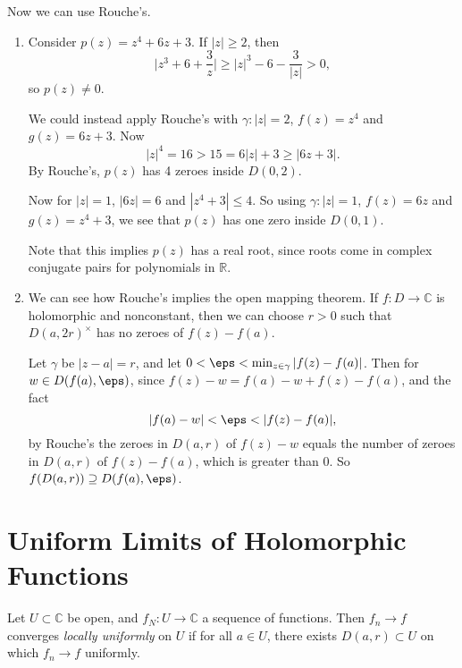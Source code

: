\documentclass[12pt]{article}
\begin{document}
Now we can use Rouche's.

\begin{exbox}
	\begin{enumerate}
		\item Consider $p(z)=  z^4 + 6z + 3$. If $|z| \ge 2$, then
			\[
			\biggl|z^3 + 6 + \frac{3}{z} \biggr| \ge |z|^3 - 6 - \frac{3}{|z|} > 0,
			\]
			so $p(z) \neq 0$.

			We could instead apply Rouche's with $\gamma : |z| = 2$, $f(z) = z^{4}$ and $g(z) = 6z + 3$. Now
			\[
			|z|^{4} = 16 > 15 = 6|z|+3 \ge |6z + 3|.
			\]
			By Rouche's, $p(z)$ has 4 zeroes inside $D(0, 2)$.

			Now for $|z| = 1$, $|6z| = 6$ and $|z^{4} + 3| \le 4$. So using $\gamma : |z| = 1$, $f(z) = 6z$ and $g(z) = z^{4} + 3$, we see that $p(z)$ has one zero inside $D(0, 1)$.

			Note that this implies $p(z)$ has a real root, since roots come in complex conjugate pairs for polynomials in $\mathbb{R}$.
		\item We can see how Rouche's implies the open mapping theorem. If $f : D \to \mathbb{C}$ is holomorphic and nonconstant, then we can choose $r > 0$ such that $D(a, 2r)^{\times}$ has no zeroes of $f(z) - f(a)$.

			Let $\gamma$ be $|z-a| = r$, and let $0 < \eps < \min_{z \in \gamma}|f(z)-f(a)|$. Then for $w \in D(f(a), \eps)$, since $f(z) - w = f(a) - w + f(z) - f(a)$, and the fact
			\[
			|f(a) - w| < \eps < |f(z) - f(a)|,
			\]
			by Rouche's the zeroes in $D(a, r)$ of $f(z) - w$ equals the number of zeroes in $D(a, r)$ of $f(z) - f(a)$, which is greater than $0$. So $f(D(a, r)) \supseteq D(f(a), \eps)$.
	\end{enumerate}
\end{exbox}

\newpage

\section{Uniform Limits of Holomorphic Functions}
\label{sec:uniform_limits_of_holomorphic_functions}

\begin{definition}
	Let $U \subset \mathbb{C}$ be open, and $f_N : U \to \mathbb{C}$ a sequence of functions. Then $f_n \to f$ converges \emph{locally uniformly} on $U$ if for all $a \in U$, there exists $D(a, r) \subset U$ on which $f_n \to f$ uniformly.
\end{definition}
\end{document}
